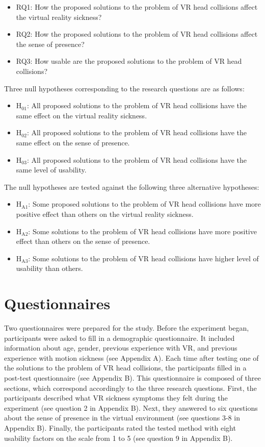 \begin{itemize}
\item RQ1: How the proposed solutions to the problem of VR head collisions affect the virtual reality sickness?
\item RQ2: How the proposed solutions to the problem of VR head collisions affect the sense of presence?
\item RQ3: How usable are the proposed solutions to the problem of VR head collisions?
\end{itemize}

Three null hypotheses corresponding to the research questions are as follows:

\begin{itemize}
\item H$_{\text{01}}$: All proposed solutions to the problem of VR head collisions have the same effect on the virtual reality sickness.
\item H$_{\text{02}}$: All proposed solutions to the problem of VR head collisions have the same effect on the sense of presence.
\item H$_{\text{03}}$: All proposed solutions to the problem of VR head collisions have the same level of usability.
\end{itemize}

The null hypotheses are tested against the following three alternative hypotheses:

\begin{itemize}
\item H$_{\text{A1}}$: Some proposed solutions to the problem of VR head collisions have more positive effect than others on the virtual reality sickness.
\item H$_{\text{A2}}$: Some solutions to the problem of VR head collisions have more positive effect than others on the sense of presence.
\item H$_{\text{A3}}$: Some solutions to the problem of VR head collisions have higher level of usability than others.
\end{itemize}

\section{Questionnaires}

Two questionnaires were prepared for the study. Before the experiment began, participants were asked to fill in a demographic questionnaire. It included information about age, gender, previous experience with VR, and previous experience with motion sickness (see Appendix A). Each time after testing one of the solutions to the problem of VR head collisions, the participants filled in a post-test questionnaire (see Appendix B). This questionnaire is composed of three sections, which correspond accordingly to the three research questions. First, the participants described what VR sickness symptoms they felt during the experiment (see question 2 in Appendix B). Next, they answered to six questions about the sense of presence in the virtual environment (see questions 3-8 in Appendix B). Finally, the participants rated the tested method with eight usability factors on the scale from 1 to 5 (see question 9 in Appendix B).

